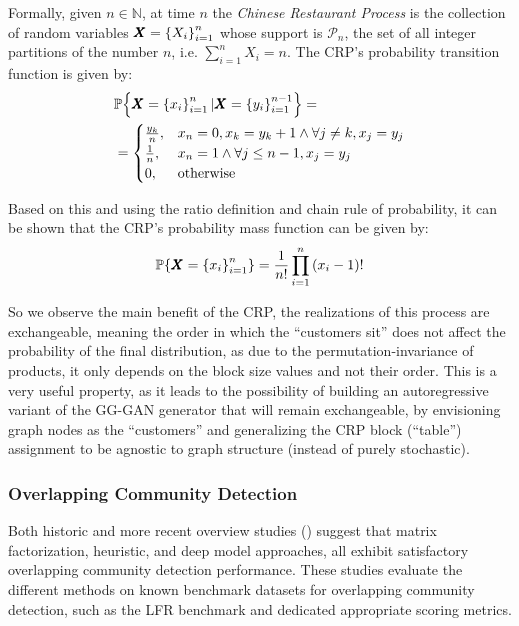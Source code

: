\begin{definition}
    Formally, given $n \in \mathbb{N}$, at time $n$ the \emph{Chinese Restaurant Process} is the collection of random variables $\pmb{X}=\mathopen{}\left\{X_i\right\}_{i=1}^{n}$ whose support is $\mathcal{P}_n$, the set of all integer partitions of the number $n$, i.e. $\sum_{i=1}^{n}{X_i}=n$. The CRP's probability transition function is given by: 
\begin{align*}
&\mathbb{P}\mathopen{}\left\{\pmb{X}=\mathopen{}\left\{x_i\right\}_{i=1}^{n} \vert \pmb{X}=\mathopen{}\left\{y_i\right\}_{i=1}^{n-1}\right\} = \\
&= \begin{cases} 
\frac{y_k}{n}, & x_n=0, x_k = y_k+1 \wedge \forall j \neq k, x_j=y_j \\
\frac{1}{n}, & x_n = 1 \wedge \forall j \leq n-1, x_j=y_j \\
0, & \text{otherwise} \end{cases}
\end{align*}
\end{definition}

Based on this and using the ratio definition and chain rule of probability, it can be shown that the CRP's probability mass function can be given by: 
$$\mathbb{P}\mathopen{}\left\{\pmb{X}=\mathopen{}\left\{x_i\right\}_{i=1}^{n}\right\} = \frac{1}{n!}\prod_{i=1}^{n}{\mathopen{}\left(x_i - 1\right)!}$$

So we observe the main benefit of the CRP, the realizations of this process are exchangeable, meaning the order in which the \enquote{customers sit} does not affect the probability of the final distribution, as due to the permutation-invariance of products, it only depends on the block size values and not their order. This is a very useful property, as it leads to the possibility of building an autoregressive variant of the GG-GAN generator that will remain exchangeable, by envisioning graph nodes as the \enquote{customers} and generalizing the CRP block (\enquote{table}) assignment to be agnostic to graph structure (instead of purely stochastic).

\subsubsection{Overlapping Community Detection}
Both historic and more recent overview studies (\cite{xie_overlapping_2013, li_deeper_2018, liu_deep_2020, vieira_comparative_2020}) suggest that matrix factorization, heuristic, and deep model approaches, all exhibit satisfactory overlapping community detection performance. These studies evaluate the different methods on known benchmark datasets for overlapping community detection, such as the LFR benchmark \cite{lancichinetti_benchmarks_2009} and dedicated appropriate scoring metrics.

